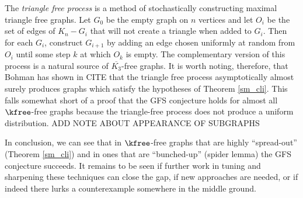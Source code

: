The \textit{triangle free process} is a method of stochastically constructing maximal triangle free graphs.  Let $G_0$ be the empty graph on $n$ vertices and let $O_i$ be the set of edges of $K_n- G_i$ that will not create a triangle when added to $G_i$.  Then for each $G_i$, construct $G_{i+1}$ by adding an edge chosen uniformly at random from $O_i$ until some step $k$ at which $O_k$ is empty.  The complementary version of this process is a natural source of $\overline{K_3}$-free graphs.  It is worth noting, therefore, that Bohman has shown in CITE that the triangle free process asymptotically almost surely produces graphs which satisfy the hypotheses of Theorem \ref{sm_cli}.  This falls somewhat short of a proof that the GFS conjecture holds for almost all $\kfree$-free graphs because the triangle-free process does not produce a uniform distribution. ADD NOTE ABOUT APPEARANCE OF SUBGRAPHS

In conclusion, we can see that in $\kfree$-free graphs that are highly ``spread-out'' (Theorem \ref{sm_cli}) and in ones that are ``bunched-up'' (spider lemma) the GFS conjecture succeeds.   It remains to be seen if further work in tuning and sharpening these techniques can close the gap, if new approaches are needed, or if indeed there lurks a counterexample somewhere in the middle ground.

